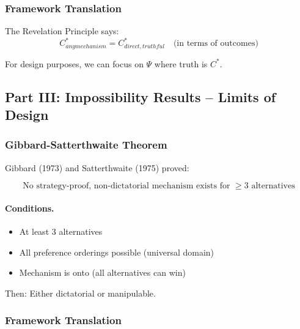 \subsubsection{Framework Translation}

The Revelation Principle says:
\begin{equation}
C^*_{any mechanism} = C^*_{direct, truthful} \quad \text{(in terms of outcomes)}
\end{equation}

For design purposes, we can focus on $\Psi$ where truth is $C^*$.

\subsection{Part III: Impossibility Results – Limits of Design}

\subsubsection{Gibbard-Satterthwaite Theorem}

Gibbard (1973) and Satterthwaite (1975) proved:

\begin{equation}
\boxed{
\text{No strategy-proof, non-dictatorial mechanism exists for } \geq 3 \text{ alternatives}
}
\label{eq:gibbard-satterthwaite}
\end{equation}

\paragraph{Conditions.}
\begin{itemize}
    \item At least 3 alternatives
    \item All preference orderings possible (universal domain)
    \item Mechanism is onto (all alternatives can win)
\end{itemize}

Then: Either dictatorial or manipulable.

\subsubsection{Framework Translation}

